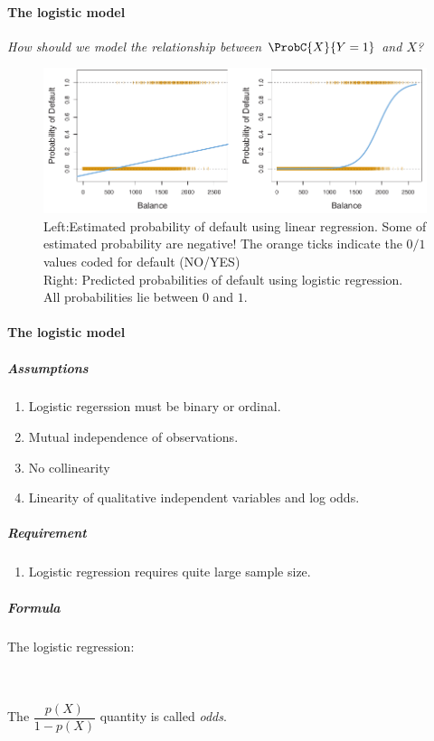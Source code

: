 \paragraph{The logistic model}
\emph{How should we model the relationship between $\ProbC{X}{Y=1}$ and
$X$?}
\begin{figure}[H]
	\begin{center}
		\includegraphics[width=\textwidth]{./chap/1chap/3sec/3images/1ProbabilityOfDefault.png}
	\end{center}
	\caption{Left:Estimated probability of default using linear
regression. Some of estimated probability are negative! The orange 
ticks indicate the $0/1$ values coded for default (NO/YES)\\Right:
Predicted probabilities of default using logistic regression.\\All
probabilities lie between $0$ and $1$.}
	\label{fig:fig3.2}
\end{figure}
\paragraph{The logistic model}
\subparagraph{Assumptions}
\begin{enumerate}
	\item Logistic regerssion must be binary or ordinal.
	\item Mutual independence of observations.
	\item No collinearity
	\item Linearity of qualitative independent variables and log odds.
\end{enumerate}


\subparagraph{Requirement}
\begin{enumerate}
	\item Logistic regression requires quite large sample size.
\end{enumerate}
\subparagraph{Formula}
The logistic regression:
\begin{center}
	\\
\\ The $\dfrac{p\left(X\right)}{1-p\left(X\right)
}$ quantity is called \emph{odds}.
\end{center}
